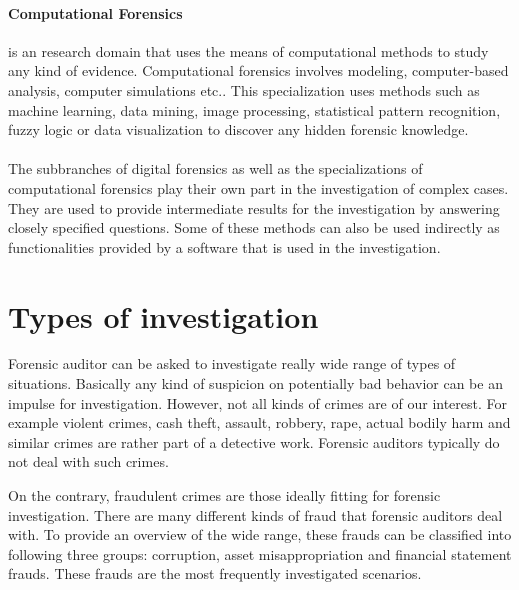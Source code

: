 \paragraph{Computational Forensics} is an research domain that uses the means of computational methods to study any kind of evidence. Computational forensics involves modeling, computer-based analysis, computer simulations etc.. This specialization uses methods such as machine learning, data mining, image processing, statistical pattern recognition, fuzzy logic or data visualization to discover any hidden forensic knowledge. 

\paragraph{} The subbranches of digital forensics as well as the specializations of computational forensics play their own part in the investigation of complex cases. They are used to provide intermediate results for the investigation by answering closely specified questions. Some of these methods can also be used indirectly as functionalities provided by a software that is used in the investigation.  




\section{Types of investigation}

Forensic auditor can be asked to investigate really wide range of types of situations. Basically any kind of suspicion on potentially bad behavior can be an impulse for investigation. However, not all kinds of crimes are of our interest. For example violent crimes, cash theft, assault, robbery, rape, actual bodily harm and similar crimes are rather part of a detective work. Forensic auditors typically do not deal with such crimes. 

On the contrary, fraudulent crimes are those ideally fitting for forensic investigation. There are many different kinds of fraud that forensic auditors deal with. To provide an overview of the wide range, these frauds can be classified into following three groups: corruption, asset misappropriation and financial statement frauds. These frauds are the most frequently investigated scenarios.

